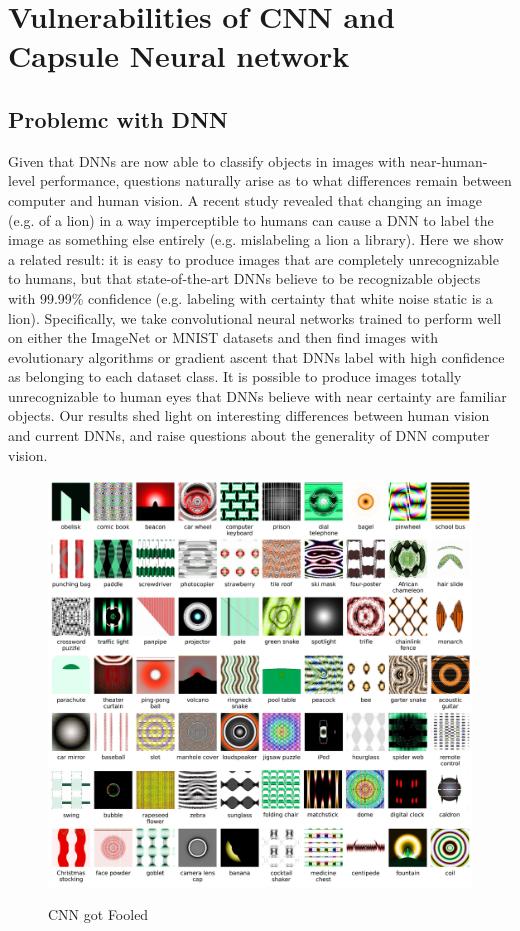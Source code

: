 \documentclass[12pt]{article}
\begin{document}
{{\section{\fontsize{14}{14}\selectfont Vulnerabilities of CNN and Capsule Neural network}   
\subsection{Problemc with DNN}
 Given that DNNs are now able to classify objects in images with near-human-level performance, questions naturally arise as to what differences remain between computer and human vision. A recent study revealed that changing an image (e.g. of a lion) in a way imperceptible to humans can cause a DNN to label the image as something else entirely (e.g. mislabeling a lion a library). Here we show a related result: it is easy to produce images that are completely unrecognizable to humans, but that state-of-the-art DNNs believe to be recognizable objects with 99.99\% confidence (e.g. labeling with certainty that white noise static is a lion). Specifically, we take convolutional neural networks trained to perform well on either the ImageNet or MNIST datasets and then find images with evolutionary algorithms or gradient ascent that DNNs label with high confidence as belonging to each dataset class. It is possible to produce images totally unrecognizable to human eyes that DNNs believe with near certainty are familiar objects. Our results shed light on interesting differences between human vision and current DNNs, and raise questions about the generality of DNN computer vision.
 
 \begin{figure}[h]
    	\centering
    	\includegraphics[width=1\textwidth]{fooled.jpg}
       	\label{fig:mesh20}
	 	 \caption{CNN got Fooled}
	\end{figure} 
 
}}
\end{document}
